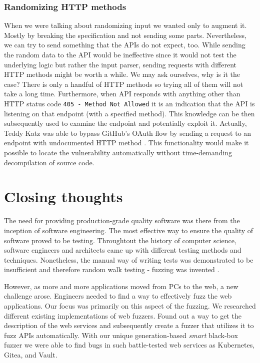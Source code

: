 \subsubsection{Randomizing HTTP methods}
When we were talking about randomizing input we wanted only to augment it. Mostly by breaking the specification and not sending some parts. Nevertheless, we can try to send something that the APIs do not expect, too. While sending the random data to the API would be ineffective since it would not test the underlying logic but rather the input parser, sending requests with different HTTP methods might be worth a while. We may ask ourselves, why is it the case? There is only a handful of HTTP methods so trying all of them will not take a long time. Furthermore, when API responds with anything other than HTTP status code \texttt{405 - Method Not Allowed} it is an indication that the API is listening on that endpoint (with a specified method). This knowledge can be then subsequently used to examine the endpoint and potentially exploit it. Actually, Teddy Katz was able to bypass GitHub's OAuth flow by sending a request to an endpoint with undocumented HTTP method \cite{kartz2019bypass}. This functionality would make it possible to locate the vulnerability automatically without time-demanding decompilation of source code.


\section{Closing thoughts}
The need for providing production-grade quality software was there from the inception of software engineering. The most effective way to ensure the quality of software proved to be testing. Throughtout the history of computer science, software engineers and architects came up with different testing methods and techniques. Nonetheless, the manual way of writing tests was demonstrated to be insufficient and therefore random walk testing - fuzzing was invented \cite{miller1990empirical}.

However, as more and more applications moved from PCs to the web, a new challenge arose. Engineers needed to find a way to effectively fuzz the web applications. Our focus was primarily on this aspect of the fuzzing. We researched different existing implementations of web fuzzers. Found out a way to get the description of the web services and subsequently create a fuzzer that utilizes it to fuzz APIs automatically. With our unique generation-based \textit{smart} black-box fuzzer we were able to find bugs in such battle-tested web services as Kubernetes, Gitea, and Vault.
